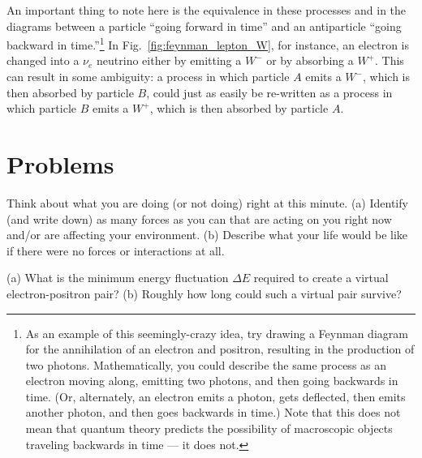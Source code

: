 
An important thing to note here is the equivalence in these
processes and in the diagrams between a particle ``going forward
in time'' and an antiparticle ``going backward in
time.''\footnote{As an example of this seemingly-crazy idea, try
drawing a Feynman diagram for the annihilation of an electron and
positron, resulting in the production of two photons.
Mathematically, you could describe the same process as an electron
moving along, emitting two photons, and then going backwards in
time.  (Or, alternately, an electron emits a photon, gets
deflected, then emits another photon, and then goes backwards in
time.)
Note that this does not mean that quantum theory predicts the
possibility of macroscopic objects traveling backwards in time ---
it does not.} In Fig.~\ref{fig:feynman_lepton_W}, for instance, an
electron is changed into a $\nu_e$ neutrino either by emitting a
$W^-$ or by absorbing a $W^+$.  This can result in some ambiguity:
a process in which particle $A$ emits a $W^-$, which is then
absorbed by particle $B$, could just as easily be re-written as a
process in which particle $B$ emits a $W^+$, which is then
absorbed by particle $A$.

\newpage

\section*{Problems}

\begin{problem}
Think about what you are doing (or not doing) right at this
minute. (a) Identify (and write down) as many forces as you can
that are acting on you right now and/or are affecting your
environment. (b) Describe what your life would be like if there
were no forces or interactions at all. 
\label{prob:think_about_forces}
\end{problem}

\begin{problem}
(a) What is the minimum energy fluctuation $\Delta E$
required  to create a virtual electron-positron pair?  
(b) Roughly how long could such a virtual pair survive?
\label{prob:pair_production}
\end{problem}


